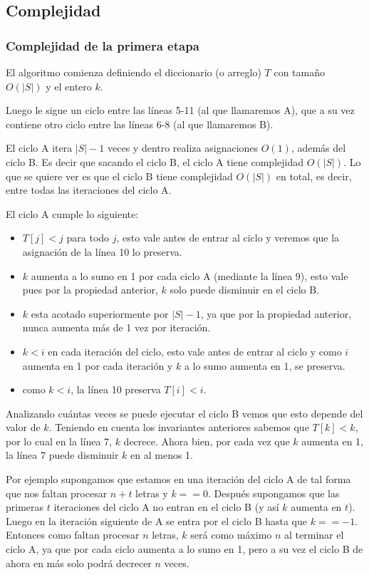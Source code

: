 \subsection{Complejidad}

\subsubsection{Complejidad de la primera etapa}

El algoritmo comienza definiendo el diccionario (o arreglo) $T$ con tamaño $O(|S|)$ y el entero $k$.

Luego le sigue un ciclo entre las líneas 5-11 (al que llamaremos A), que a su vez contiene otro ciclo
entre las líneas 6-8 (al que llamaremos B).

El ciclo A itera $|S|-1$ veces y dentro realiza asignaciones $O(1)$, además del ciclo B. Es decir que
sacando el ciclo B, el ciclo A tiene complejidad $O(|S|)$. Lo que se quiere ver es que el ciclo B tiene
complejidad $O(|S|)$ en total, es decir, entre todas las iteraciones del ciclo A.

El ciclo A cumple lo siguiente:
\begin{itemize}
	\item $T[j] < j$ para todo $j$, esto vale antes de entrar al ciclo
	y veremos que la asignación de la línea 10 lo preserva.
	\item $k$ aumenta a lo sumo en 1 por cada ciclo A (mediante la línea 9), esto vale pues por la
	propiedad anterior, $k$ solo puede disminuir en el ciclo B.
	\item $k$ esta acotado superiormente por $|S|-1$, ya que por la propiedad anterior, nunca
	aumenta más de 1 vez por iteración.
	\item $k < i$ en cada iteración del ciclo, esto vale antes de entrar al ciclo
	y como $i$ aumenta en 1 por cada iteración y $k$ a lo sumo aumenta en 1, se preserva.
	\item como $k < i$, la línea 10 preserva $T[i] < i$.
\end{itemize}

Analizando cuántas veces se puede ejecutar el ciclo B vemos que esto depende del valor de $k$.
Teniendo en cuenta los invariantes anteriores sabemos que $T[k] < k$, por lo cual en la línea 7,
$k$ decrece. Ahora bien, por cada vez que $k$ aumenta en 1, la línea 7 puede disminuir $k$ en al menos 1.

Por ejemplo supongamos que estamos en una iteración del ciclo A de tal forma que nos faltan procesar $n+t$
letras y $k == 0$. Después supongamos que las primeras $t$ iteraciones del ciclo A no entran en el ciclo B
(y así $k$ aumenta en $t$). Luego en la iteración siguiente de A se entra por el ciclo B hasta que
$k == -1$. Entonces como faltan procesar $n$ letras, $k$ será como máximo $n$ al terminar el ciclo A, 
ya que por cada ciclo aumenta a lo sumo en 1, pero a su vez el ciclo B de ahora en más solo podrá
decrecer $n$ veces.

